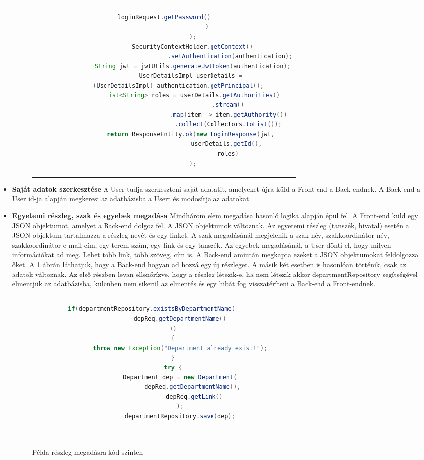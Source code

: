 \begin{itemize}
\begin{figure}[thp]
\begin{tabular}{c}
\begin{lstlisting}[language=JAVA]
							loginRequest.getPassword()
						)
				);
				SecurityContextHolder.getContext()
									 .setAuthentication(authentication);
				String jwt = jwtUtils.generateJwtToken(authentication);
				UserDetailsImpl userDetails = 
				(UserDetailsImpl) authentication.getPrincipal();		
				List<String> roles = userDetails.getAuthorities()
						   			.stream()
						   			.map(item -> item.getAuthority())
						   			.collect(Collectors.toList());
				return ResponseEntity.ok(new LoginResponse(jwt, 
							  		userDetails.getId(), 
							  		roles)
				);
			\end{lstlisting}
		\end{tabular}
	\end{figure}

	\item \textbf{Saját adatok szerkesztése}
A User tudja szerkeszteni saját adatatit, amelyeket újra küld a Front-end a Back-endnek. A Back-end a User id-ja alapján megkeresi az adatbázisba a Usert és modosítja az adatokat.
	
	\item \textbf{Egyetemi részleg, szak és egyebek megadása}
Mindhárom elem megadása hasonló logika alapján épül fel. A Front-end küld egy JSON objektumot, amelyet a Back-end dolgoz fel. A JSON objektumok változnak. Az egyetemi részleg (tanszék, hivatal) esetén a JSON objektum tartalmazza a részleg nevét és egy linket. A szak megadásánál megjelenik a szak név, szakkoordinátor név, szakkoordinátor e-mail cím, egy terem szám, egy link és egy tanszék. Az egyebek megadásánál, a User dönti el, hogy milyen információkat ad meg. Lehet több link, több szöveg, cím is. A Back-end amiután megkapta ezeket a JSON objektumokat feldolgozza őket. A \ref{addDepartment} ábrán láthatjuk, hogy a Back-end hogyan ad hozzá egy új részleget. A másik két esetben is hasonlóan történik, csak az adatok változnak. Az első részben levan ellenőrízve, hogy a részleg létezik-e, ha nem létezik akkor departmentRepository segítségével elmentjük az adatbázisba, különben nem sikerül az elmentés és egy hibát fog visszatéríteni a Back-end a Front-endnek.
\begin{figure}[thp]
	\centering
	\caption{Példa részleg megadásra kód szinten}
	\label{addDepartment}
	\begin{tabular}{c}
		\begin{lstlisting}[language=JAVA]
			if(departmentRepository.existsByDepartmentName(
				depReq.getDepartmentName()
			))
			{
				throw new Exception("Department already exist!");
			}
			try {
				Department dep = new Department(
						depReq.getDepartmentName(), 
						depReq.getLink()
				);
				departmentRepository.save(dep);
				

\end{lstlisting}
\end{tabular}
\end{figure}
\end{itemize}
